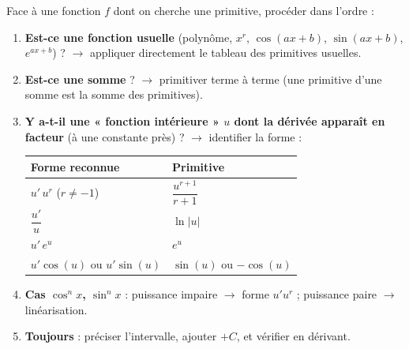 \documentclass[11pt]{article}
\begin{document}
\begin{methode}
Face à une fonction $f$ dont on cherche une primitive, procéder dans l'ordre :
\begin{enumerate}
\item \textbf{Est-ce une fonction usuelle} (polynôme, $x^r$, $\cos(ax+b)$, $\sin(ax+b)$, $e^{ax+b}$) ? $\to$ appliquer directement le tableau des primitives usuelles.
\item \textbf{Est-ce une somme} ? $\to$ primitiver terme à terme (une primitive d'une somme est la somme des primitives).
\item \textbf{Y a-t-il une « fonction intérieure » $u$ dont la dérivée apparaît en facteur} (à une constante près) ? $\to$ identifier la forme :
\begin{center}
\begin{tabularx}{\linewidth}{|l|X|}
\hline
\rowcolor{popblueL} \textbf{Forme reconnue} & \textbf{Primitive} \\
\hline
$u'\,u^r$ ($r \neq -1$) & $\dfrac{u^{r+1}}{r+1}$ \\
\hline
$\dfrac{u'}{u}$ & $\ln|u|$ \\
\hline
$u'\,e^u$ & $e^u$ \\
\hline
$u'\cos(u)$ ou $u'\sin(u)$ & $\sin(u)$ ou $-\cos(u)$ \\
\hline
\end{tabularx}
\end{center}
\item \textbf{Cas $\cos^n x$, $\sin^n x$} : puissance impaire $\to$ forme $u'u^r$ ; puissance paire $\to$ linéarisation.
\item \textbf{Toujours} : préciser l'intervalle, ajouter $+C$, et vérifier en dérivant.
\end{enumerate}
\end{methode}
\end{document}
